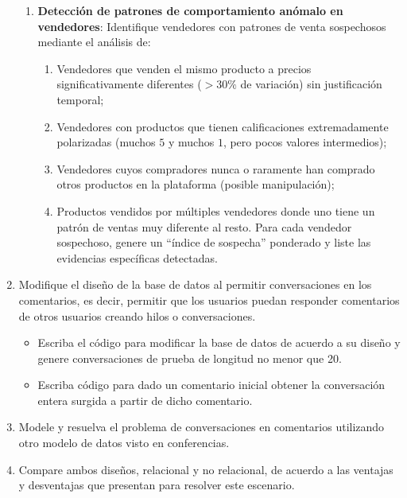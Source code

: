 \documentclass[10pt]{article}
\begin{document}
\begin{enumerate}
\begin{enumerate}
             \item \textbf{Detección de patrones de comportamiento anómalo en vendedores}: Identifique vendedores con patrones de venta sospechosos mediante el análisis de: 
             \begin{enumerate}
             	\item Vendedores que venden el mismo producto a precios significativamente diferentes ($>30\%$ de variación) sin justificación temporal; 
             	\item Vendedores con productos que tienen calificaciones extremadamente polarizadas (muchos $5$ y muchos $1$, pero pocos valores intermedios); 
             	\item  Vendedores cuyos compradores nunca o raramente han comprado otros productos en la plataforma (posible manipulación); 
             	\item Productos vendidos por múltiples vendedores donde uno tiene un patrón de ventas muy diferente al resto. Para cada vendedor sospechoso, genere un ``índice de sospecha'' ponderado y liste las evidencias específicas detectadas.
             \end{enumerate}
             
         \end{enumerate}
        
		
		\item Modifique el diseño de la base de datos al permitir conversaciones en los comentarios, es decir, permitir que los usuarios puedan responder comentarios de otros usuarios creando hilos o conversaciones.
		
		\begin{itemize}
			\item Escriba el código para modificar la base de datos de acuerdo a su diseño y genere conversaciones de prueba de longitud no menor que 20.
			
			\item Escriba código para dado un comentario inicial obtener la conversación entera surgida a partir de dicho comentario.
		\end{itemize}
		
		\item Modele y resuelva el problema de conversaciones en comentarios utilizando otro modelo de datos visto en conferencias.
		
		\item Compare ambos diseños, relacional y no relacional, de acuerdo a las ventajas y desventajas que presentan para resolver este escenario.
		

\end{enumerate}
\end{document}
